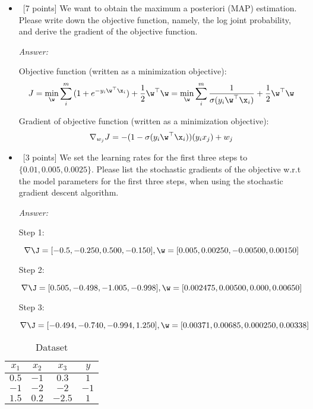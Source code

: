 \documentclass[12pt, fullpage,letterpaper]{article}
\begin{document}
\begin{enumerate}
	\begin{itemize}
		\item~[7 points] We want to obtain the  maximum a posteriori (MAP) estimation. Please write down the objective function, namely, the log joint probability, and derive the gradient of the objective function. 

			\textit{Answer:}

			Objective function (written as a minimization objective):
			\[
				J = \min_{\w} \sum_i^m{(1 + e^{-y_i \w^{\top} \x_i})} + \frac{1}{2} \w^{\top} \w = \min_{\w} \sum_i^m{\frac{1}{\sigma(y_i \w^{\top} \x_i)}} + \frac{1}{2} \w^{\top} \w
			\]

			Gradient of objective function (written as a minimization objective): 
			\[
				\nabla_{w_{j}} J = -(1 - \sigma(y_i \w^{\top} \x_i)) (y_i x_j) + w_j
			\]

	
		\item~[3 points] We set the learning rates for the first three steps to $\{0.01, 0.005, 0.0025\}$.  Please list the stochastic gradients of the objective w.r.t the model parameters for the first three steps, when using the stochastic gradient descent algorithm. 

			\textit{Answer:}

			Step 1:

			\[
			\nabla \J = [-0.5, -0.250, 0.500, -0.150], \w = [0.005, 0.00250, -0.00500, 0.00150]
			\]

			Step 2:

			\[
			\nabla \J = [0.505, -0.498, -1.005, -0.998], \w = [0.002475, 0.00500, 0.000, 0.00650]
			\]

			Step 3:

			\[
			\nabla \J = [-0.494, -0.740, -0.994, 1.250], \w = [0.00371, 0.00685, 0.000250, 0.00338]
			\]

	\end{itemize}
	\begin{table}[h]
		\centering
		\begin{tabular}{ccc|c}
			$x_1$ & $x_2$ & $x_3$ &  $y$\\ 
			\hline\hline
			$0.5$ & $-1$ & $0.3$ & $1$ \\ \hline
			$-1$ & $-2$ & $-2$ & $-1$\\ \hline
			$1.5$ & $0.2$ & $-2.5$ & $1$\\ \hline
		\end{tabular}
	\caption{Dataset} 
	\label{tb:dt}
	\end{table}

	
\end{enumerate}
\end{document}
